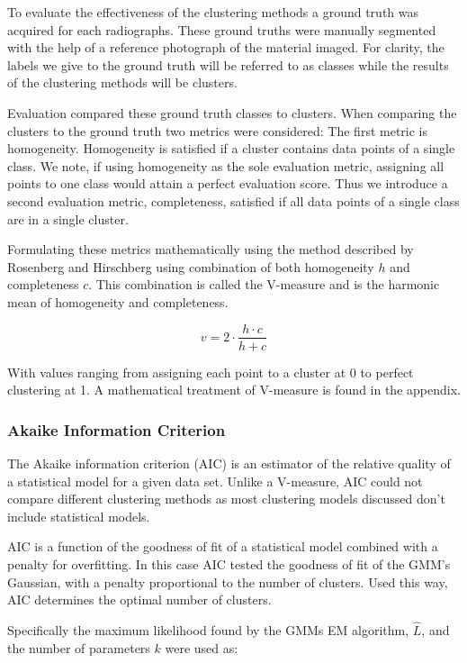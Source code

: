 \documentclass[a4paper,11pt]{article}
\begin{document}
To evaluate the effectiveness of the clustering methods a ground truth was acquired for each radiographs. These ground truths were manually segmented with the help of a reference photograph of the material imaged. For clarity, the labels we give to the ground truth will be referred to as classes while the results of the clustering methods will be clusters.

Evaluation compared these ground truth classes to clusters. When comparing the clusters to the ground truth two metrics were considered: The first metric is homogeneity. Homogeneity is satisfied if a cluster contains data points of a single class. We note, if using homogeneity as the sole evaluation metric, assigning all points to one class would attain a perfect evaluation score. Thus we introduce a second evaluation metric, completeness, satisfied if all data points of a single class are in a single cluster. 

Formulating these metrics mathematically using the method described by Rosenberg and Hirschberg using combination of both homogeneity $h$ and completeness $c$. This combination is called the V-measure and is the harmonic mean of homogeneity and completeness.

\begin{equation}
v = 2 \cdot \frac{h \cdot c}{h + c}
\end{equation}

With values ranging from assigning each point to a cluster at 0 to perfect clustering at 1. A mathematical treatment of V-measure is found in the appendix.

\subsubsection{Akaike Information Criterion}

The Akaike information criterion (AIC) is an estimator of the relative quality of a statistical model for a given data set. Unlike a V-measure, AIC could not compare different clustering methods as most clustering models discussed don't include statistical models.

AIC is a function of the goodness of fit of a statistical model combined with a penalty for overfitting. In this case AIC tested the goodness of fit of the GMM's Gaussian, with a penalty proportional to the number of clusters. Used this way, AIC determines the optimal number of clusters.

Specifically the maximum likelihood found by the GMMs EM algorithm, $\hat L$, and the number of parameters $k$ were used as:
\end{document}
